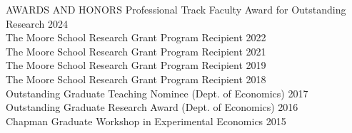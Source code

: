 \documentclass{resume}
\begin{document}
\begin{rSection}{AWARDS AND HONORS} 
Professional Track Faculty Award for Outstanding Research
  \hfill 2024\\
	The Moore School Research Grant Program Recipient \hfill 2022\\
	The Moore School Research Grant Program Recipient \hfill 2021\\
	The Moore School Research Grant Program Recipient \hfill 2019\\	
The Moore School Research Grant Program Recipient \hfill 2018\\	
Outstanding Graduate Teaching Nominee (Dept. of Economics) \hfill 2017\\	
Outstanding Graduate Research Award (Dept. of Economics) \hfill 2016\\
Chapman Graduate Workshop in Experimental Economics \hfill 2015\\

\end{rSection}


\end{document}
